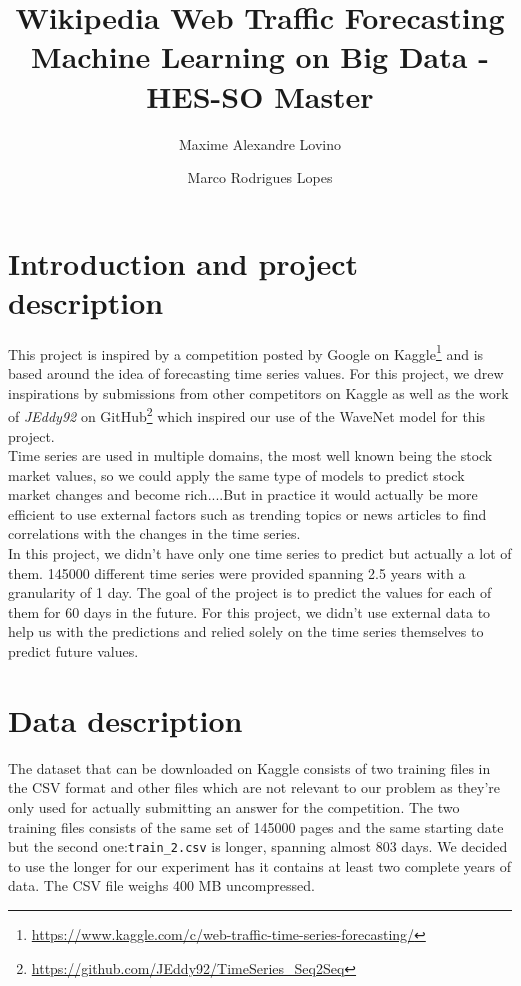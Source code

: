 \documentclass[11pt]{article}
\title{Wikipedia Web Traffic Forecasting\\Machine Learning on Big Data - HES-SO Master}
\author{Maxime Alexandre Lovino \and Marco Rodrigues Lopes}
\begin{document}
    \maketitle
    \section{Introduction and project description}
    This project is inspired by a competition posted by Google on Kaggle\footnote{\url{https://www.kaggle.com/c/web-traffic-time-series-forecasting/}} and is based around the idea of forecasting time series values. For this project, we drew inspirations by submissions from other competitors on Kaggle as well as the work of \emph{JEddy92} on GitHub\footnote{\url{https://github.com/JEddy92/TimeSeries_Seq2Seq}} which inspired our use of the WaveNet model for this project.\\

    Time series are used in multiple domains, the most well known being the stock market values, so we could apply the same type of models to predict stock market changes and become rich....But in practice it would actually be more efficient to use external factors such as trending topics or news articles to find correlations with the changes in the time series.\\

    In this project, we didn't have only one time series to predict but actually a lot of them. 145000 different time series were provided spanning 2.5 years with a granularity of 1 day. The goal of the project is to predict the values for each of them for 60 days in the future. For this project, we didn't use external data to help us with the predictions and relied solely on the time series themselves to predict future values.
    \newpage
    \section{Data description}
    The dataset that can be downloaded on Kaggle consists of two training files in the CSV format and other files which are not relevant to our problem as they're only used for actually submitting an answer for the competition. The two training files consists of the same set of 145000 pages and the same starting date but the second one:\verb+train_2.csv+ is longer, spanning almost 803 days. We decided to use the longer for our experiment has it contains at least two complete years of data. The CSV file weighs 400 MB uncompressed.\\
\end{document}
